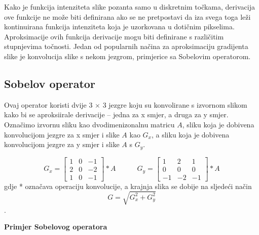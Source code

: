 \documentclass[times, utf8, zavrsni]{fer}
\begin{document}
\bigbreak

Kako je funkcija intenziteta slike pozanta samo u diskretnim točkama, derivacija ove funkcije 
ne može biti definirana ako se ne pretpostavi da iza svega toga leži kontinuirana funkcija 
intenziteta koja je uzorkovana u dotičnim pikselima. Aproksimacije ovih funkcija derivacije 
mogu biti definirane s različitim stupnjevima točnosti. Jedan od popularnih načina za 
aproksimaciju gradijenta slike je konvolucija slike s nekom jezgrom, primjerice sa Sobelovim operatorom.

\newpage

\subsection{Sobelov operator}

Ovaj operator koristi dvije 3 \(\times\) 3 jezgre koju su konvolirane s izvornom slikom kako bi se aproksiirale 
derivacije – jedna za x smjer, a druga za y smjer. Označimo izvornu sliku kao dvodimenizonalnu matricu \(A\), sliku
koja je dobivena konvolucijom jezgre za x smjer i slike \(A\) kao \(G_x\), a sliku koja je dobivena konvolucijom 
jezgre za y smjer i slike \(A\) s \(G_y\).

\[G_x = 
\begin{bmatrix} 
1 & 0 & -1\\ 
2 & 0 & -2\\ 
1 & 0 & -1 
\end{bmatrix}
 * A
  \quad\quad\quad
 G_y = 
\begin{bmatrix} 
 1 & 2 & 1\\ 
 0 & 0 & 0\\ 
 -1 & -2 & -1
\end{bmatrix}
 * A
\]
\bigbreak
gdje * označava operaciju konvolucije, a krajnja slika se dobije na sljedeći način 
\[
G = \sqrt{G_x^2 + G_y^2}
\].

{\large\textbf{Primjer Sobelovog operatora}}
\end{document}
